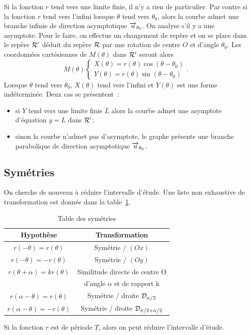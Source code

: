 Si la fonction \(r\) tend vers une limite finie, il n'y a rien de particulier.
Par contre si la fonction \(r\) tend vers l'infini lorsque \(\theta\) tend vers
\(\theta_0\), alors la courbe admet une branche infinie de direction
asymptotique \(\overrightarrow{u}_{\theta_0}\). On analyse s'il y a une asymptote. Pour le
faire, on effectue un changement de repère et on se place dans le repère
\(\mathcal{R}'\) déduit du repère \(\mathcal{R}\) par une rotation de centre \(O\) et d'angle
\(\theta_0\). Les coordonnées cartésiennes de \(M(\theta)\) dans \(\mathcal{R}'\)
seront alors
\begin{equation}
  M(\theta)
  \begin{cases}
    X(\theta)=r(\theta)\cos(\theta-\theta_0)\\
    Y(\theta)=r(\theta)\sin(\theta-\theta_0)
  \end{cases}.
\end{equation}
Lorsque \(\theta\) tend vers \(\theta_0\), \(X(\theta)\) tend vers l'infini et
\(Y(\theta)\) est une forme indéterminée. Deux cas se présentent~:
\begin{itemize}
  \item si \(Y\) tend vers une limite finie \(L\) alors la courbe admet une
    asymptote d'équation \(y = L\) dans \(\mathcal{R}'\);
  \item sinon la courbe n'admet pas d'asymptote, le graphe présente une branche
    parabolique de direction asymptotique \(\overrightarrow{u}_{\theta_0}\).
\end{itemize}

\subsection{Symétries}

On cherche de nouveau à réduire l'intervalle d'étude. Une liste non exhaustive
de transformation est donnée dans la table~\ref{tab:sympol}.
\begin{table}
  \centering
  \begin{tabular}{|c|c|}    \hline
    Hypothèse & Transformation \\
    \hline
    \(r(-\theta)=r(\theta)\) & Symétrie / \((Ox)\) \\
    \hline
    \(r(-\theta)=-r(\theta)\) & Symétrie / \((Oy)\) \\
    \hline
    \(r(\theta + \alpha)=kr(\theta)\) & Similitude directe de centre O \\ &
    d'angle \(\alpha\) et de rapport k \\ \hline
    \(r(\alpha-\theta)=r(\theta)\) & Symétrie / droite \(\mathcal{D}_{\alpha/2}\) \\
    \hline
    \(r(\alpha-\theta)=-r(\theta)\) & Symétrie / droite \(\mathcal{D}_{\pi/2 +
    \alpha/2}\) \\
    \hline
  \end{tabular}
  \caption{Table des symétries}
  \label{tab:sympol}
\end{table}
Si la fonction \(r\) est de période \(T\), alors on peut réduire l'intervalle
d'étude.
